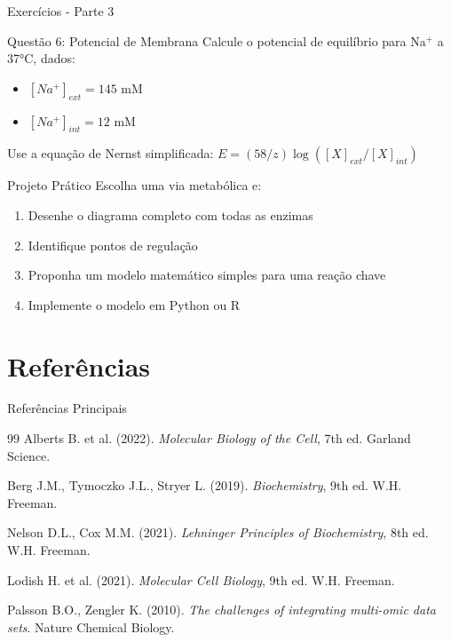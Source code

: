 \begin{frame}[allowframebreaks]{Exercícios - Parte 3}
\begin{block}{Questão 6: Potencial de Membrana}
Calcule o potencial de equilíbrio para Na$^+$ a 37°C, dados:
\begin{itemize}
    \item $[Na^+]_{ext} = 145$ mM
    \item $[Na^+]_{int} = 12$ mM
\end{itemize}
Use a equação de Nernst simplificada: $E = (58/z) \log([X]_{ext}/[X]_{int})$
\end{block}

\begin{alertblock}{Projeto Prático}
Escolha uma via metabólica e:
\begin{enumerate}
    \item Desenhe o diagrama completo com todas as enzimas
    \item Identifique pontos de regulação
    \item Proponha um modelo matemático simples para uma reação chave
    \item Implemente o modelo em Python ou R
\end{enumerate}
\end{alertblock}
\end{frame}

\section{Referências}

\begin{frame}{Referências Principais}
\begin{thebibliography}{99}
 Alberts B. et al. (2022). \textit{Molecular Biology of the Cell}, 7th ed. Garland Science.

 Berg J.M., Tymoczko J.L., Stryer L. (2019). \textit{Biochemistry}, 9th ed. W.H. Freeman.

 Nelson D.L., Cox M.M. (2021). \textit{Lehninger Principles of Biochemistry}, 8th ed. W.H. Freeman.

 Lodish H. et al. (2021). \textit{Molecular Cell Biology}, 9th ed. W.H. Freeman.

 Palsson B.O., Zengler K. (2010). \textit{The challenges of integrating multi-omic data sets}. Nature Chemical Biology.
\end{thebibliography}
\end{frame}

